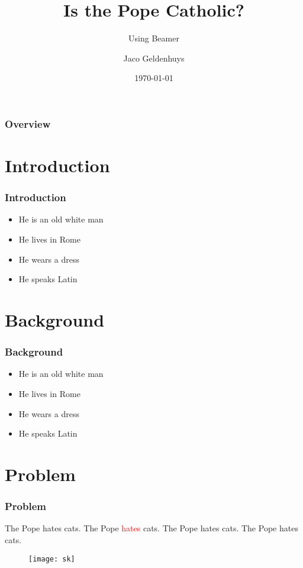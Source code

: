\documentclass{beamer}
\title{Is the Pope Catholic?}
\subtitle{Using Beamer}
\author{Jaco Geldenhuys}
\institute{Stellenbosch University}
\date{\today}
\begin{document}
\begin{frame}
	\titlepage
\end{frame}

\begin{frame}
	\frametitle{Overview}
	\tableofcontents
\end{frame}

\section{Introduction}

\begin{frame}
	\frametitle{Introduction}
	\begin{itemize}
		\item<1,3> He is an old white man
		\item<2> He lives in Rome
		\item<1,3> He wears a dress
		\item<4> He speaks Latin
	\end{itemize}
\end{frame}

\section{Background}

\begin{frame}
	\frametitle{Background}
	\begin{itemize}
		\item He is an old white man
		\item He lives in Rome
		\item He wears a dress
		\item He speaks Latin
	\end{itemize}
\end{frame}

\section{Problem}

\begin{frame}
	\frametitle{Problem}
	The Pope hates cats.
	The Pope \textcolor<2>{red}{hates} cats.
	The Pope hates cats.
	The Pope hates cats.
	\begin{figure}
		\texttt{[image: sk]}
	\end{figure}
\end{frame}
\end{document}
